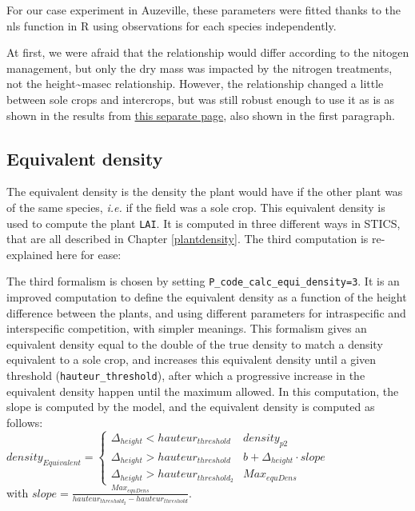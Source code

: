 \documentclass[
]{book}
\begin{document}
For our case experiment in Auzeville, these parameters were fitted thanks to the nls function in R using observations for each species independently.

At first, we were afraid that the relationship would differ according to the nitogen management, but only the dry mass was impacted by the nitrogen treatments, not the height\textasciitilde masec relationship. However, the relationship changed a little between sole crops and intercrops, but was still robust enough to use it as is as shown in the results from \href{Auzeville_summary.html}{this separate page}, also shown in the first paragraph.

\hypertarget{equivalent-density}{%
\subsection{Equivalent density}\label{equivalent-density}}

The equivalent density is the density the plant would have if the other plant was of the same species, \emph{i.e.} if the field was a sole crop. This equivalent density is used to compute the plant \texttt{LAI}. It is computed in three different ways in STICS, that are all described in Chapter \ref{plantdensity}. The third computation is re-explained here for ease:

The third formalism is chosen by setting \texttt{P\_code\_calc\_equi\_density=3}. It is an improved computation to define the equivalent density as a function of the height difference between the plants, and using different parameters for intraspecific and interspecific competition, with simpler meanings. This formalism gives an equivalent density equal to the double of the true density to match a density equivalent to a sole crop, and increases this equivalent density until a given threshold (\texttt{hauteur\_threshold}), after which a progressive increase in the equivalent density happen until the maximum allowed. In this computation, the slope is computed by the model, and the equivalent density is computed as follows:\\
\(density_{Equivalent} =\begin{cases}\Delta_{height} < hauteur_{threshold} & density_{p2} \\ \Delta_{height} > hauteur_{threshold} & b + \Delta_{height}\cdot slope \\ \Delta_{height} > hauteur_{threshold_2} & Max_{equDens} \end{cases}\)\\
with \(slope= \frac{Max_{equDens}}{hauteur_{threshold_2}-hauteur_{threshold}}\).
\end{document}
